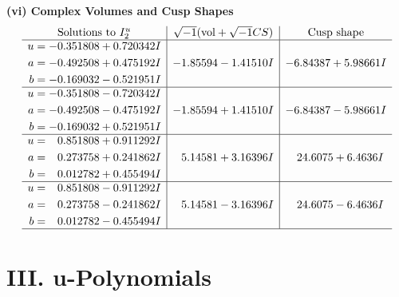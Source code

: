 \documentclass[1p]{elsarticle_modified}
\theoremstyle{definition}
\newcommand{\I}{\sqrt{-1}}
\begin{document}
\newpage\flushleft \textbf{(vi) Complex Volumes and Cusp Shapes}
$$\begin{array}{c|c|c}  
\text{Solutions to }I^u_{2}& \I (\text{vol} + \sqrt{-1}CS) & \text{Cusp shape}\\
 \hline 
\begin{aligned}
u &= -0.351808 + 0.720342 I \\
a &= -0.492508 + 0.475192 I \\
b &= -0.169032 - 0.521951 I\end{aligned}
 & -1.85594 - 1.41510 I & -6.84387 + 5.98661 I \\ \hline\begin{aligned}
u &= -0.351808 - 0.720342 I \\
a &= -0.492508 - 0.475192 I \\
b &= -0.169032 + 0.521951 I\end{aligned}
 & -1.85594 + 1.41510 I & -6.84387 - 5.98661 I \\ \hline\begin{aligned}
u &= \phantom{-}0.851808 + 0.911292 I \\
a &= \phantom{-}0.273758 + 0.241862 I \\
b &= \phantom{-}0.012782 + 0.455494 I\end{aligned}
 & \phantom{-}5.14581 + 3.16396 I & \phantom{-}24.6075 + 6.4636 I \\ \hline\begin{aligned}
u &= \phantom{-}0.851808 - 0.911292 I \\
a &= \phantom{-}0.273758 - 0.241862 I \\
b &= \phantom{-}0.012782 - 0.455494 I\end{aligned}
 & \phantom{-}5.14581 - 3.16396 I & \phantom{-}24.6075 - 6.4636 I\\
 \hline 
 \end{array}$$\newpage
\newpage\renewcommand{\arraystretch}{1}
\centering \section*{ III. u-Polynomials}
\end{document}
